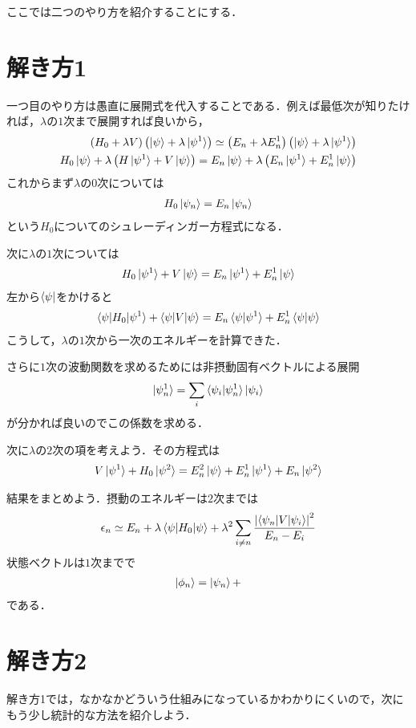 \documentclass[a4j]{jarticle}
\begin{document}
ここでは二つのやり方を紹介することにする．


\section{解き方1}
一つ目のやり方は愚直に展開式を代入することである．例えば最低次が知りたければ，$\lambda$の$1$次まで展開すれば良いから，
\begin{align*}
 \left(H_0+\lambda V\right)\left(\ket{\psi}+\lambda \ket{\psi^1}\right)\simeq\left(E_n+\lambda E_n^1\right)\left(\ket{\psi}+\lambda \ket{\psi^1}\right) \\
 H_0\ket{\psi}+\lambda \left(H\ket{\psi^1}+V\ket{\psi}\right)=E_n\ket{\psi}+\lambda\left(E_n\ket{\psi^1}+E_n^1\ket{\psi}\right)
\end{align*}
これからまず$\lambda$の$0$次については
\begin{align*}
 H_0\ket{\psi_n}=E_n\ket{\psi_n}
\end{align*}
という$H_0$についてのシュレーディンガー方程式になる．

次に$\lambda$の$1$次については
\begin{align*}
 H_0\ket{\psi^1}+V\ket{\psi}=E_n\ket{\psi^1}+E_n^1\ket{\psi}
\end{align*}
左から$\bra{\psi}$をかけると
\begin{align*}
  \braket{\psi|H_0|\psi^1}+\braket{\psi|V|\psi}=E_n\braket{\psi|\psi^1}+E_n^1\braket{\psi|\psi}
\end{align*}
こうして，$\lambda$の$1$次から一次のエネルギーを計算できた．

さらに$1$次の波動関数を求めるためには非摂動固有ベクトルによる展開
\begin{align*}
 \ket{\psi_n^1}=\sum_{i}\braket{\psi_i|\psi_n^1}\ket{\psi_i}
\end{align*}
が分かれば良いのでこの係数を求める．　　　　　　





次に$\lambda$の$2$次の項を考えよう．その方程式は
\begin{align*}
 V\ket{\psi^1}+H_0\ket{\psi^2}=E_n^2\ket{\psi}+E_n^1\ket{\psi^1}+E_n\ket{\psi^2}
\end{align*}

結果をまとめよう．摂動のエネルギーは$2$次までは
\begin{align*}
 \epsilon_n\simeq E_n+\lambda\braket{\psi|H_0|\psi}+\lambda^2\sum_{i\neq n}\frac{\left|\braket{\psi_n|V|\psi_i}\right|^2}{E_n-E_i}
\end{align*}
状態ベクトルは$1$次までで
\begin{align*}
 \ket{\phi_n}= \ket{\psi_n}+
\end{align*}
である．

\section{解き方2}
解き方1では，なかなかどういう仕組みになっているかわかりにくいので，次にもう少し統計的な方法を紹介しよう．
\end{document}
